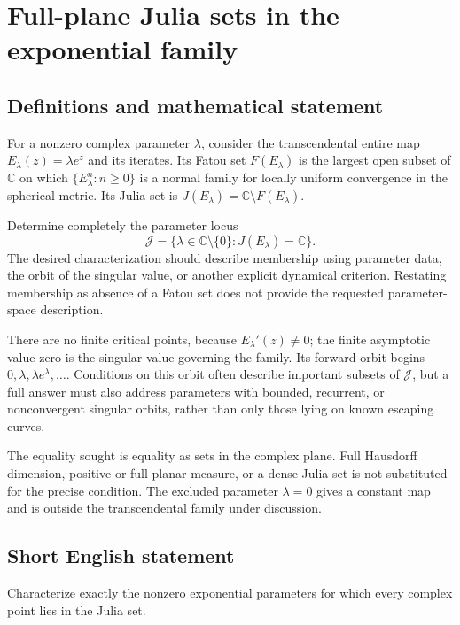 \documentclass[11pt,a4paper]{article}
\begin{document}
\section*{Full-plane Julia sets in the exponential family}\label{statement}

\subsection{Definitions and mathematical statement}
For a nonzero complex parameter $\lambda$, consider the transcendental
entire map $E_\lambda(z)=\lambda e^z$ and its iterates. Its Fatou set
$F(E_\lambda)$ is the largest open subset of $\mathbb C$ on which
$\{E_\lambda^n:n\ge0\}$ is a normal family for locally uniform
convergence in the spherical metric. Its Julia set is
$J(E_\lambda)=\mathbb C\setminus F(E_\lambda)$.

Determine completely the parameter locus
\[
 \mathcal J=\{\lambda\in\mathbb C\setminus\{0\}:
                       J(E_\lambda)=\mathbb C\}.
\]
The desired characterization should describe membership using parameter
data, the orbit of the singular value, or another explicit dynamical
criterion. Restating membership as absence of a Fatou set does not
provide the requested parameter-space description.

There are no finite critical points, because $E_\lambda'(z)\ne0$;
the finite asymptotic value zero is the singular value governing
the family. Its forward orbit begins $0,\lambda,\lambda e^\lambda,
\ldots$. Conditions on this orbit often describe important subsets
of $\mathcal J$, but a full answer must also address parameters with
bounded, recurrent, or nonconvergent singular orbits, rather than
only those lying on known escaping curves.

The equality sought is equality as sets in the complex plane. Full
Hausdorff dimension, positive or full planar measure, or a dense
Julia set is not substituted for the precise condition. The excluded
parameter $\lambda=0$ gives a constant map and is outside the
transcendental family under discussion.
\subsection{Short English statement}
Characterize exactly the nonzero exponential parameters for which every complex point lies in the Julia set.
\end{document}
